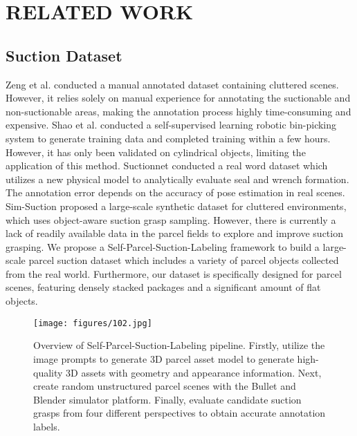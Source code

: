\section{RELATED WORK}
\label{introduction}



\subsection{Suction Dataset} 
Zeng et al. \cite{zeng2022robotic} conducted a manual annotated dataset containing cluttered scenes. However, it relies solely on manual experience for annotating the suctionable and non-suctionable areas, making the annotation process highly time-consuming and expensive. Shao et al. \cite{shao2019suction} conducted a self-supervised learning robotic bin-picking system to generate training data and completed training within a few hours. However, it has only been validated on cylindrical objects, limiting the application of this method. Suctionnet \cite{Suctionnet} conducted a real word dataset which utilizes a new physical model to analytically evaluate seal and wrench formation. The annotation error depends on the accuracy of pose estimation in real scenes. Sim-Suction \cite{Sim-Suction} proposed a large-scale synthetic dataset for cluttered environments, which uses object-aware suction grasp sampling. However, there is currently a lack of readily available data in the parcel fields to explore and improve suction grasping. We propose a Self-Parcel-Suction-Labeling framework to build a large-scale parcel suction dataset which includes a variety of parcel objects collected from the real world. Furthermore, our dataset is specifically designed for parcel scenes, featuring densely stacked packages and a significant amount of flat objects.


\begin{figure*}[t]
	\centering
		\texttt{[image: figures/102.jpg]}
	\caption{Overview of Self-Parcel-Suction-Labeling pipeline. Firstly, utilize the image prompts to generate 3D parcel asset model to generate high-quality 3D assets with geometry and appearance information. Next, create random unstructured parcel scenes with the Bullet and Blender simulator platform. Finally, evaluate candidate suction grasps from four different perspectives to obtain accurate annotation labels.
    }
	\label{fig:fig102}
\end{figure*}


